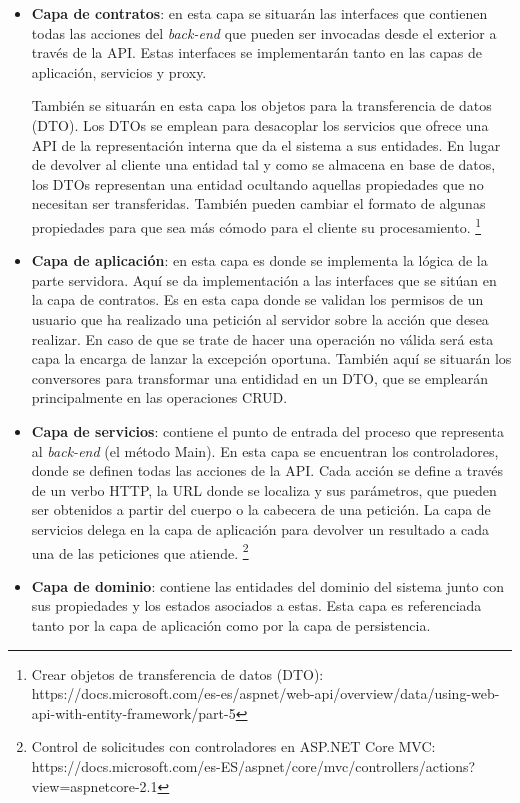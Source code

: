 \documentclass[11pt,spanish,listoffigures]{tfgetsinf}
\begin{document}
\begin{itemize}

\item \textbf{Capa de contratos}: en esta capa se situarán las interfaces que contienen todas las acciones del \textit{back-end} que pueden ser invocadas desde el exterior a través de la API. Estas interfaces se implementarán tanto en las capas de aplicación, servicios y proxy. 

También se situarán en esta capa los objetos para la transferencia de datos (DTO). Los DTOs se emplean para desacoplar los servicios que ofrece una API de la representación interna que da el sistema a sus entidades. En lugar de devolver al cliente una entidad tal y como se almacena en base de datos, los DTOs representan una entidad ocultando aquellas propiedades que no necesitan ser transferidas. También pueden cambiar el formato de algunas propiedades para que sea más cómodo para el cliente su procesamiento. \footnote{ Crear objetos de transferencia de datos (DTO): https://docs.microsoft.com/es-es/aspnet/web-api/overview/data/using-web-api-with-entity-framework/part-5}

\item \textbf{Capa de aplicación}: en esta capa es donde se implementa la lógica de la parte servidora. Aquí se da implementación a las interfaces que se sitúan en la capa de contratos. Es en esta capa donde se validan los permisos de un usuario que ha realizado una petición al servidor sobre la acción que desea realizar. En caso de que se trate de hacer una operación no válida será esta capa la encarga de lanzar la excepción oportuna. También aquí se situarán los conversores para transformar una entididad en un DTO, que se emplearán principalmente en las operaciones CRUD.

\item \textbf{Capa de servicios}: contiene el punto de entrada del proceso que representa al \textit{back-end} (el método Main). En esta capa se encuentran los controladores, donde se definen todas las acciones de la API. Cada acción se define a través de un verbo HTTP, la URL donde se localiza y sus parámetros, que pueden ser obtenidos a partir del cuerpo o la cabecera de una petición. La capa de servicios delega en la capa de aplicación para devolver un resultado a cada una de las peticiones que atiende. \footnote{ Control de solicitudes con controladores en ASP.NET Core MVC: https://docs.microsoft.com/es-ES/aspnet/core/mvc/controllers/actions?view=aspnetcore-2.1}

\item \textbf{Capa de dominio}: contiene las entidades del dominio del sistema junto con sus propiedades y los estados asociados a estas. Esta capa es referenciada tanto por la capa de aplicación como por la capa de persistencia.


\end{itemize}
\end{document}
